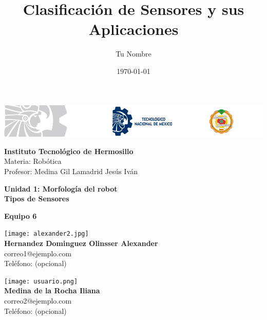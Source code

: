 \documentclass{article}
\title{Clasificación de Sensores y sus Aplicaciones}
\author{Tu Nombre}
\date{\today}
\begin{document}
	
	\begin{titlepage}
		
		\begin{center}
			
			\includegraphics[width=\textwidth]{header-ith.png}
			
			\vspace{0.5cm}
			
			\textbf{Instituto Tecnológico de Hermosillo} \\
			Materia: Robótica \\
			Profesor: Medina Gil Lamadrid Jesús Iván \\
			
			\vspace{0.5cm}
			
			\textbf{Unidad 1: Morfología del robot} \\
			{\Huge \textbf{Tipos de Sensores}} \\
			
			\vspace{0.5cm}
			
			\textbf{Equipo 6} \\
			
			\begin{minipage}{0.45\textwidth}
				\begin{center}
					\texttt{[image: alexander2.jpg]} \\
					\textbf{Hernandez Dominguez Olinsser Alexander} \\
					correo1@ejemplo.com \\
					Teléfono: (opcional)
				\end{center}
			\end{minipage}
			\hfill
			\begin{minipage}{0.45\textwidth}
				\begin{center}
					\texttt{[image: usuario.png]} \\
					\textbf{Medina de la Rocha Iliana} \\
					correo2@ejemplo.com \\
					Teléfono: (opcional)
				\end{center}
			\end{minipage}
			
			\vspace{0.5cm}
			

\end{center}
\end{titlepage}
\end{document}
